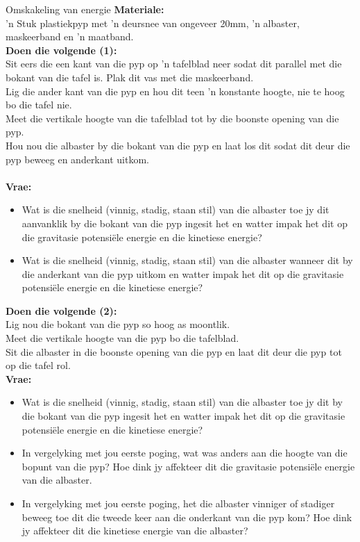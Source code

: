 \begin{activity}{Omskakeling van energie}
\textbf{Materiale:}\\
  'n Stuk plastiekpyp met   'n deursnee van ongeveer 20mm,   'n albaster, maskeerband en   'n maatband.  \\
\textbf{Doen die volgende (1):}\\
Sit eers die een kant van die pyp op   'n tafelblad neer sodat dit parallel met die bokant van die tafel is. Plak dit vas met die maskeerband. \\
Lig die ander kant van die pyp en hou dit teen   'n konstante hoogte, nie te hoog bo die tafel nie.\\
Meet die vertikale hoogte van die tafelblad tot by die boonste opening van die pyp. \\
Hou nou die albaster by die bokant van die pyp en laat los dit sodat dit deur die pyp beweeg en anderkant uitkom.\\ \\
\textbf{Vrae:}\\ 
\begin{itemize}
\item Wat is die snelheid (vinnig, stadig, staan stil) van die albaster toe jy dit aanvanklik by die bokant van die pyp ingesit het en watter impak het dit op die gravitasie potensiële energie en die kinetiese energie?
\item Wat is die snelheid (vinnig, stadig, staan stil) van die albaster wanneer dit by die anderkant van die pyp uitkom en watter impak het dit op die gravitasie potensiële energie en die kinetiese energie?
\end{itemize}

\textbf{Doen die volgende (2):}\\
Lig nou die bokant van die pyp so hoog as moontlik. \\
Meet die vertikale hoogte van die pyp bo die tafelblad. \\
Sit die albaster in die boonste opening van die pyp en laat dit deur die pyp tot op die tafel rol.\\
\textbf{Vrae:}\\ 
\begin{itemize}
\item Wat is die snelheid (vinnig, stadig, staan stil) van die albaster toe jy dit by die bokant van die pyp ingesit het en watter impak het dit op die gravitasie potensiële energie en die kinetiese energie?
\item In vergelyking met jou eerste poging, wat was anders aan die hoogte van die bopunt van die pyp? Hoe dink jy affekteer dit die gravitasie potensiële energie van die albaster.
\item In vergelyking met jou eerste poging, het die albaster vinniger of stadiger beweeg toe dit die tweede keer aan die onderkant van die pyp kom? Hoe dink jy affekteer dit die kinetiese energie van die albaster?
\end{itemize}
\end{activity}

